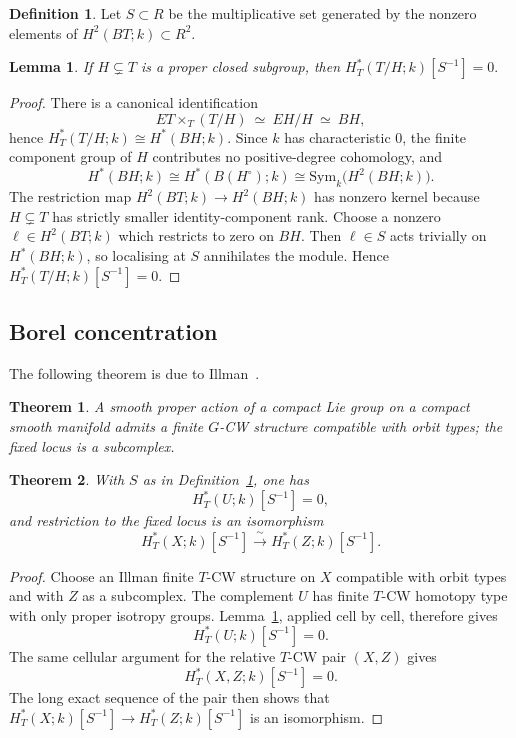 \documentclass[10pt,a4paper,dvipsnames,x11names]{amsart}
\numberwithin{equation}{section}
\theoremstyle{plain}
\newtheorem{theorem}{Theorem}[section]
\newtheorem{lemma}[lemma]{Lemma}
\theoremstyle{definition}
\newtheorem{definition}[definition]{Definition}
\theoremstyle{remark}
\begin{document}
\begin{definition} \label{def:abbvS}
Let $S\subset R$ be the multiplicative set generated by the nonzero elements of $H^2(BT;k)\subset R^2$.
\end{definition}

\begin{lemma} \label{lem:kill-isotropy}
If $H\subsetneq T$ is a proper closed subgroup, then
$
H_T^*(T/H;k)[S^{-1}]=0.
$
\end{lemma}

\begin{proof}
There is a canonical identification
$$
ET\times_T (T/H)\ \simeq\ EH/H\ \simeq\ BH,
$$
hence $H_T^*(T/H;k)\cong H^*(BH;k)$.
Since $k$ has characteristic $0$, the finite component group of $H$ contributes no positive-degree cohomology, and
\[
H^*(BH;k)\cong H^*(B(H^\circ);k)\cong \mathrm{Sym}_k\bigl(H^2(BH;k)\bigr).
\]
The restriction map $H^2(BT;k)\to H^2(BH;k)$ has nonzero kernel because $H\subsetneq T$ has strictly smaller identity-component rank.  Choose a nonzero
$\ell\in H^2(BT;k)$ which restricts to zero on $BH$.  Then $\ell\in S$ acts trivially on $H^*(BH;k)$, so localising at $S$ annihilates the module.  Hence $H_T^*(T/H;k)[S^{-1}]=0$.
\end{proof}

\subsection{Borel concentration}

The following theorem is due to Illman~\cite{Illman}.
\begin{theorem}\label{thm:illman-cw}
A smooth proper action of a compact Lie group on a compact smooth manifold admits a finite $G$-CW structure
compatible with orbit types; the fixed locus is a subcomplex.
\end{theorem}

\begin{theorem}\label{thm:borel-conc}
With $S$ as in Definition~\ref{def:abbvS}, one has
\[
H_T^*(U;k)[S^{-1}]=0,
\]
and restriction to the fixed locus is an isomorphism
\[
H_T^*(X;k)[S^{-1}]\xrightarrow{\ \sim\ }H_T^*(Z;k)[S^{-1}].
\]
\end{theorem}

\begin{proof}
Choose an Illman finite $T$-CW structure on $X$ compatible with orbit types and with $Z$ as a subcomplex.  The complement $U$ has finite $T$-CW homotopy type with only proper isotropy groups.  Lemma~\ref{lem:kill-isotropy}, applied cell by cell, therefore gives
\[
H_T^*(U;k)[S^{-1}]=0.
\]
The same cellular argument for the relative $T$-CW pair $(X,Z)$ gives
\[
H_T^*(X,Z;k)[S^{-1}]=0.
\]
The long exact sequence of the pair then shows that $H_T^*(X;k)[S^{-1}]\to H_T^*(Z;k)[S^{-1}]$ is an isomorphism.
\end{proof}
\end{document}
